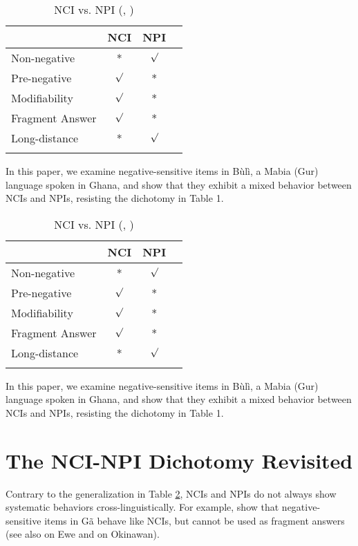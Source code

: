 \documentclass[output=paper,colorlinks,citecolor=brown]{langscibook}
\begin{document}
\begin{table}
  \begin{tabular}{lccl}
\lspbottomrule
 & NCI & NPI    \\
   \midrule
 Non-negative & *  & $\surd$   \\
Pre-negative &  $\surd$ & *   \\
Modifiability & $\surd$  & *    \\
Fragment Answer & $\surd$ & *   \\
Long-distance & *  & $\surd$    \\
\lspbottomrule
  \end{tabular}
  \caption{NCI vs. NPI (\citealt{Vallduvi1994}, \citealt{Giannakidou2000})}
  \label{nci-npia}
\end{table}
In this paper, we examine negative-sensitive items in Bùlì, a Mabia (Gur) language spoken in Ghana, and show that they exhibit a mixed behavior between NCIs and NPIs, resisting the dichotomy in Table 1.


\begin{table}
  \begin{tabular}{lccl}
\lspbottomrule
 & NCI & NPI    \\
   \midrule
 Non-negative & *  & $\surd$   \\
Pre-negative &  $\surd$ & *   \\
Modifiability & $\surd$  & *    \\
Fragment Answer & $\surd$ & *   \\
Long-distance & *  & $\surd$    \\
\lspbottomrule
  \end{tabular}
  \caption{NCI vs. NPI (\citealt{Vallduvi1994}, \citealt{Giannakidou2000})}
  \label{nci-npib}
\end{table}
In this paper, we examine negative-sensitive items in Bùlì, a Mabia (Gur) language spoken in Ghana, and show that they exhibit a mixed behavior between NCIs and NPIs, resisting the dichotomy in Table 1.

\section{The NCI-NPI Dichotomy Revisited}

Contrary to the generalization in Table \ref{nci-npib}, NCIs and NPIs do not always show systematic behaviors cross-linguistically.  For example, \cite{KorsahMurphy2017Ga} show that negative-sensitive items in G\~a behave like NCIs, but cannot be used as fragment answers (see also \citealt{CollinsEtAl2017} on Ewe and \cite{Hiraiwa2019} on Okinawan).
\end{document}
